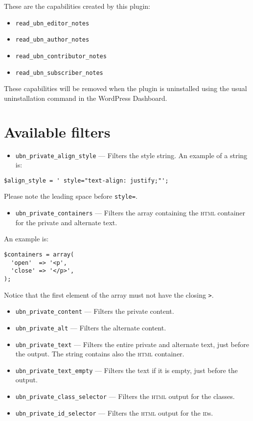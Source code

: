 These are the capabilities created by this plugin:

\begin{itemize}
 \item \verb+read_ubn_editor_notes+
 \item \verb+read_ubn_author_notes+
 \item \verb+read_ubn_contributor_notes+
 \item \verb+read_ubn_subscriber_notes+
\end{itemize}

These capabilities will be removed when the plugin is uninstalled using the
usual uninstallation command in the WordPress Dashboard.

\section{Available filters}

\begin{itemize}
 \item \verb+ubn_private_align_style+ --- Filters the style string. An example of
 a string is:
\end{itemize}

\begin{lstlisting}
$align_style = ' style="text-align: justify;"';
\end{lstlisting}

Please note the leading space before \verb+style=+.

\begin{itemize}
 \item \verb+ubn_private_containers+ --- Filters the array containing the
 \textsc{html} container for the private and alternate text.
\end{itemize}

An example is:

\begin{lstlisting}
$containers = array(
  'open'  => '<p',
  'close' => '</p>',
);
\end{lstlisting}

Notice that the first element of the array must not have the closing \verb+>+.

\begin{itemize}
 \item \verb+ubn_private_content+ --- Filters the private content.
 \item \verb+ubn_private_alt+ --- Filters the alternate content.
 \item \verb+ubn_private_text+ --- Filters the entire private and alternate text,
 just before the output. The string contains also the \textsc{html} container.
 \item \verb+ubn_private_text_empty+ --- Filters the text if it is empty, just
 before the output.
 \item \verb+ubn_private_class_selector+ --- Filters the \textsc{html} output for
 the classes.
 \item \verb+ubn_private_id_selector+ --- Filters the \textsc{html} output for the
 \textsc{id}s.
\end{itemize}

